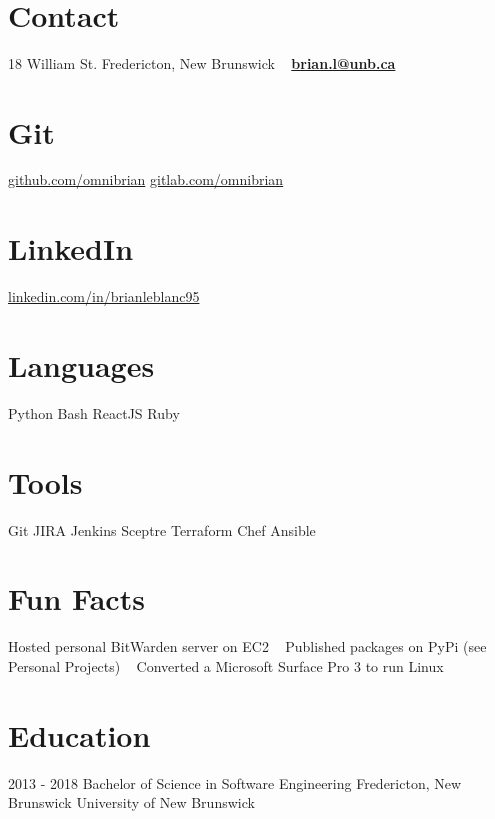 \documentclass[a4paper]{resume}
\begin{document}


\begin{aside}
    ~
    ~
    ~
    ~
    ~
  \section{Contact}
    18 William St.
    Fredericton,
    New Brunswick
    ~
    \textbf{\href{mailto:brian.l@unb.ca}{brian.l@unb.ca}}
    ~
  \section{Git}
    \href{https://github.com/omnibrian}{github.com/omnibrian}
    \href{https://gitlab.com/omnibrian}{gitlab.com/omnibrian}
    ~
  \section{LinkedIn}
    \href{https://www.linkedin.com/in/brianleblanc95/}{linkedin.com/in/brianleblanc95}
    ~
  \section{Languages}
    Python
    Bash
    ReactJS
    Ruby
    ~
  \section{Tools}
    Git
    JIRA
    Jenkins
    Sceptre
    Terraform
    Chef
    Ansible
    ~
  \section{Fun Facts}
    Hosted personal BitWarden server on EC2
    ~
    Published packages on PyPi (see Personal Projects)
    ~
    Converted a Microsoft Surface Pro 3 to run Linux
    ~
\end{aside}

\section{Education}
\begin{entrylist}
  \entry
    {2013 - 2018}
    {Bachelor of Science in Software Engineering}
    {Fredericton, New Brunswick}
    {University of New Brunswick}
\end{entrylist}
\end{document}
